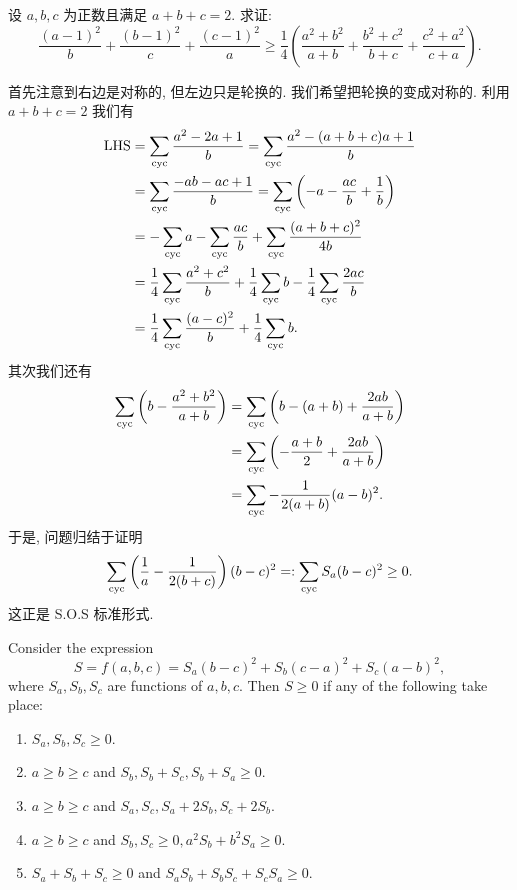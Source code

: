 \begin{prob}
\label{prob:prob-3}
设 $a,b,c$ 为正数且满足 $a + b + c = 2$. 求证:
\[
\frac{(a-1)^2}{b} + \frac{(b-1)^2}{c} + \frac{(c-1)^2}{a} \ge
\frac{1}{4}\left(\frac{a^2+b^2}{a+b} + \frac{b^2+c^2}{b+c} + \frac{c^2+a^2}{c+a}\right).
\]
\end{prob}

\begin{soln}
首先注意到右边是对称的, 但左边只是轮换的.
我们希望把轮换的变成对称的. 利用 $a + b + c = 2$ 我们有
\begin{align*}
\text{LHS} &= \sum_{\mathrm{cyc}} \frac{a^2 - 2a +1}{b}
            = \sum_{\mathrm{cyc}} \frac{a^2 - (a+b+c)a + 1}{b}\\
           &= \sum_{\mathrm{cyc}} \frac{-ab-ac+1}{b}
            = \sum_{\mathrm{cyc}} \left(-a - \frac{ac}{b} + \frac{1}{b}\right)\\
           &= -\sum_{\mathrm{cyc}} a - \sum_{\mathrm{cyc}} \frac{ac}{b} + \sum_{\mathrm{cyc}} \frac{(a+b+c)^2}{4b}\\
           &=\frac{1}{4}\sum_{\mathrm{cyc}}\frac{a^2+c^2}{b} +
             \frac{1}{4}\sum_{\mathrm{cyc}} b - \frac{1}{4}\sum_{\mathrm{cyc}} \frac{2ac}{b}\\
           &= \frac{1}{4}\sum_{\mathrm{cyc}} \frac{(a-c)^2}{b} + \frac{1}{4}\sum_{\mathrm{cyc}} b.
\end{align*}
其次我们还有
\begin{align*}
\sum_{\mathrm{cyc}} \left(b - \frac{a^2+b^2}{a+b}\right)
&= \sum_{\mathrm{cyc}} \left(b - (a+b) + \frac{2ab}{a+b}\right)\\
&= \sum_{\mathrm{cyc}} \left(-\frac{a+b}{2}+\frac{2ab}{a+b}\right)\\
&= \sum_{\mathrm{cyc}} -\frac{1}{2(a+b)}(a-b)^2.
\end{align*}
于是, 问题归结于证明
\begin{equation}
\label{eq:sos}
\sum_{\mathrm{cyc}} \left(\frac{1}{a} - \frac{1}{2(b+c)}\right)(b-c)^2
=: \sum_{\mathrm{cyc}} S_a(b-c)^2 \ge 0.
\end{equation}
这正是 S.O.S 标准形式.

\begin{thm}[S.O.S]
\label{thm:sos}
Consider the expression
\[
S = f(a,b,c) = S_a(b-c)^2 + S_b(c-a)^2 + S_c(a-b)^2,
\]
where $S_a, S_b, S_c$ are functions of $a,b,c$.
Then $S \ge 0$ if any of the following take place:
\begin{enumerate}[label={\normalfont(\roman*)}]
\item $S_a, S_b, S_c \ge 0$.
\item $a \ge b \ge c$ and $S_b, S_b + S_c, S_b + S_a \ge 0$.
\item $a \ge b \ge c$ and $S_a, S_c, S_a + 2S_b, S_c + 2S_b$.
\item $a \ge b \ge c$ and $S_b, S_c \ge 0, a^2S_b + b^2S_a \ge 0$.
\item $S_a + S_b + S_c \ge 0$ and $S_aS_b + S_bS_c + S_cS_a \ge 0$.
\end{enumerate}
\end{thm}


\end{soln}
